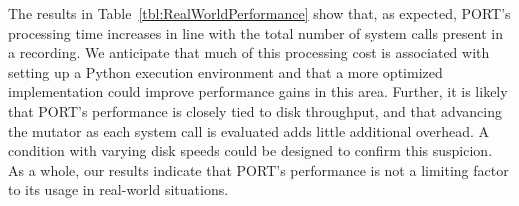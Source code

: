 The results in Table~\ref{tbl:RealWorldPerformance} show that, as expected,
PORT's
processing time increases in line with the total number of system calls
present in a recording.  We anticipate that much of this processing cost is
associated with setting up a Python execution environment and that a more
optimized implementation could improve performance gains in this area.
Further,
it is likely that PORT's performance is closely tied to
disk throughput,
and that advancing the mutator
as each system call is evaluated
adds little additional overhead.
A condition with varying disk
speeds could be designed to confirm this suspicion.  As a whole, our
results indicate that PORT's performance is not a limiting factor to its
usage in real-world situations.

